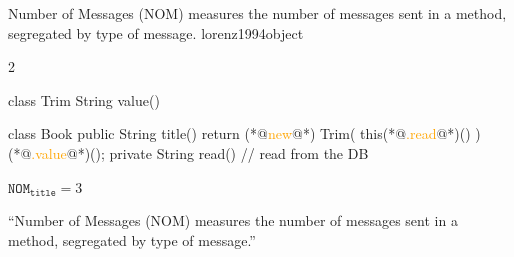 \documentclass{article}
\begin{document}
  {Number of Messages (NOM) measures the number of messages sent in a method, segregated by type of message.}
  {lorenz1994object}

\begin{multicols}{2}
{\small\begin{ffcode}
class Trim
  String value()

class Book
  public String title()
    return (*@\textcolor{orange}{new}@*) Trim(
      this(*@\textcolor{orange}{.read}@*)()
    )(*@\textcolor{orange}{.value}@*)();
  private String read()
    // read from the DB
\end{ffcode}
}
\par\columnbreak\par
\(\texttt{NOM}_\texttt{title} = 3\)\par
``Number of Messages (NOM) measures the number of messages sent in a method, segregated by type of message.''
\end{multicols}
\plush{}
\end{document}
